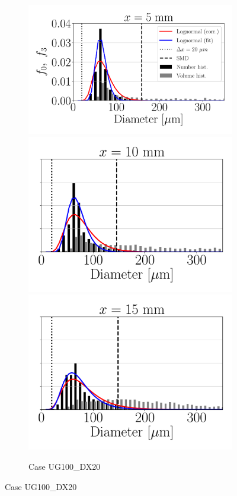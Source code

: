 \begin{figure}[ht]
\begin{subfigure}[b]{1.1\textwidth}
	\flushleft
   \includegraphics[scale=0.25]{./part2_developments/figures_ch5_resolved_JICF/SPRAY_characterization/histograms_size_volume/UG100_DX20_x05_histograms}
   \includegraphics[scale=0.25]{./part2_developments/figures_ch5_resolved_JICF/SPRAY_characterization/histograms_size_volume/UG100_DX20_x10_histograms}
   \includegraphics[scale=0.25]{./part2_developments/figures_ch5_resolved_JICF/SPRAY_characterization/histograms_size_volume/UG100_DX20_x15_histograms}
	\caption{Case UG100\_DX20}
\end{subfigure}


\end{figure}
